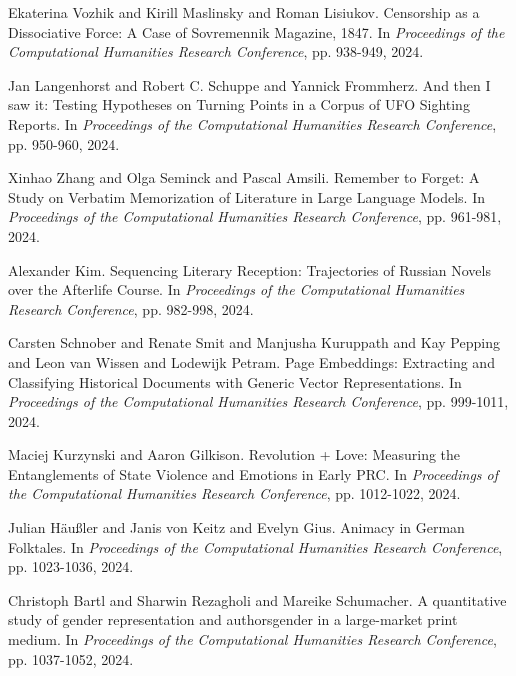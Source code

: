 \begin{thebibliography}{99}
 Ekaterina Vozhik and Kirill Maslinsky and Roman Lisiukov. {C}ensorship as a {D}issociative {F}orce: {A} Case of {S}ovremennik {M}agazine, 1847. In \textit{Proceedings of the Computational Humanities Research Conference}, pp. 938-949, 2024.

 Jan Langenhorst and Robert C. Schuppe and Yannick Frommherz. {A}nd then {I} saw it: {T}esting {H}ypotheses on {T}urning {P}oints in a {C}orpus of {U}FO {S}ighting {R}eports. In \textit{Proceedings of the Computational Humanities Research Conference}, pp. 950-960, 2024.

 Xinhao Zhang and Olga Seminck and Pascal Amsili. {R}emember to {F}orget: {A} Study on {V}erbatim {M}emorization of {L}iterature in {L}arge {L}anguage {M}odels. In \textit{Proceedings of the Computational Humanities Research Conference}, pp. 961-981, 2024.

 Alexander Kim. {S}equencing {L}iterary {R}eception: {T}rajectories of {R}ussian {N}ovels over the {A}fterlife {C}ourse. In \textit{Proceedings of the Computational Humanities Research Conference}, pp. 982-998, 2024.

 Carsten Schnober and Renate Smit and Manjusha Kuruppath and Kay Pepping and Leon van Wissen and Lodewijk Petram. {P}age {E}mbeddings: {E}xtracting and {C}lassifying {H}istorical {D}ocuments with {G}eneric {V}ector {R}epresentations. In \textit{Proceedings of the Computational Humanities Research Conference}, pp. 999-1011, 2024.

 Maciej Kurzynski and Aaron Gilkison. {R}evolution + {L}ove: {M}easuring the {E}ntanglements of {S}tate {V}iolence and {E}motions in {E}arly {P}RC. In \textit{Proceedings of the Computational Humanities Research Conference}, pp. 1012-1022, 2024.

 Julian H{\"a}u{\ss}ler and Janis von Keitz and Evelyn Gius. {A}nimacy in {G}erman {F}olktales. In \textit{Proceedings of the Computational Humanities Research Conference}, pp. 1023-1036, 2024.

 Christoph Bartl and Sharwin Rezagholi and Mareike Schumacher. {A} quantitative study of gender representation and authors\textquotesingle  gender in a large-market print medium. In \textit{Proceedings of the Computational Humanities Research Conference}, pp. 1037-1052, 2024.


\end{thebibliography}
